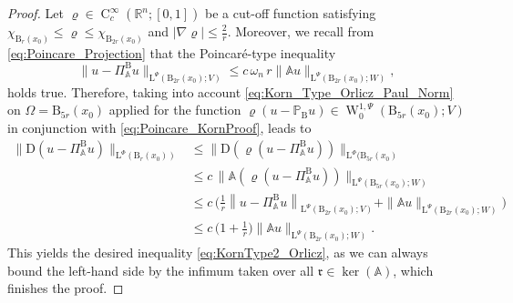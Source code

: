 \documentclass[a4paper,10pt,reqno,oneside]{amsart}
\numberwithin{equation}{section}
\newcommand{\R}{\mathbb R}
\newcommand{\ball}{\mathrm{B}}
\newcommand{\Aop}{\mathbb{A}}
\newcommand{\sobo}{\operatorname{W}}
\newcommand{\hold}{\operatorname{C}}
\newcommand{\D}{\mathrm{D}}
\newcommand{\abs}[1]{\left\lvert#1\right\rvert}
\newcommand{\Proj}{\mathbb{P}}
\newcommand{\rfrak}{\mathfrak{r}}
\renewcommand{\L}{\mathrm{L}}
\begin{document}
\begin{proof}
	Let $\varrho\in\hold^\infty_c(\R^n;[0,1])$ be a cut-off function satisfying $\chi_{\ball_{r}(x_0)}\leq \varrho\leq \chi_{\ball_{2r}(x_0)}$ and $\abs{\nabla\varrho}\leq\frac{2}{r}$. Moreover, we recall from \eqref{eq:Poincare_Projection} that the  Poincar\'e-type inequality 
	\begin{equation}\label{eq:Poincare_KornProof}
		\|u-\Pi_\Aop^\ball u\|_{\L^\Psi(\ball_{2r}(x_0);V)} \leq c\,\omega_n\, r\|\Aop u\|_{\L^\Psi(\ball_{2r}(x_0);W)},
	\end{equation}
	holds true. Therefore, taking into account \eqref{eq:Korn_Type_Orlicz_Paul_Norm} on $\Omega=\ball_{5r}(x_0)$ applied for the function $\varrho(u-\Proj_\ball u)\in\sobo^{1,\Psi}_0(\ball_{5r}(x_0);V)$ in conjunction with \eqref{eq:Poincare_KornProof}, leads to 
	\begin{align*}
		\|\D (u-\Pi_\Aop^\ball u)\|_{\L^\Phi(\ball_{r}(x_0))} 
		&\leq \|\D (\varrho(u-\Pi_\Aop^\ball u))\|_{\L^\Phi(\ball_{5r}(x_0)}\\
		& \leq c \,\|\Aop (\varrho(u-\Pi_\Aop^\ball u))\|_{\L^\Psi(\ball_{5r}(x_0);W)}\\
		&\leq c \,\bigg( \frac1r\left\|u-\Pi_\Aop^\ball u\right\|_{\L^\Psi(\ball_{2r}(x_0);V)} +  \|\Aop u\|_{\L^\Psi(\ball_{2r}(x_0); W)}\bigg)\\
		&\leq c\,\bigg(1+\frac{1}{r}\bigg) \|\Aop u\|_{\L^\Psi(\ball_{2r}(x_0);W)}.
	\end{align*}
	This yields the desired inequality \eqref{eq:KornType2_Orlicz}, as we can always bound the left-hand side by the infimum taken over all $\rfrak\in\ker(\Aop)$, which finishes the proof. 
\end{proof}
\end{document}

